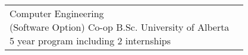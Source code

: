 \section*{}
\begin{tabular}{@{\raggedright}p{} |>{\raggedright\arraybackslash}p{}}
    \cvdegree
    {2017--2022}
    {Computer Engineering \newline (Software Option) Co-op}
    {B.Sc.}
    {University of Alberta\newline}
    {5 year program including 2 internships} \\
\end{tabular}

